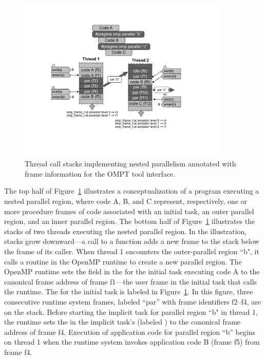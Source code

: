    \begin{figure}[h]
    \centering
        \includegraphics[width=4in]{appendices/callstack-cropped.pdf}
    \caption{Thread call stacks implementing nested parallelism
      annotated with frame information for the OMPT tool interface.}
    \label{fig:frame}
\end{figure}

The top half of Figure~\ref{fig:frame} illustrates a
conceptualization of a program executing a nested
parallel region, where code A, B, and C represent, respectively, one
or more procedure frames of code
associated with an initial task, an outer parallel region, and an inner parallel
region. The bottom half of Figure~\ref{fig:frame} illustrates the stacks of two
threads executing the nested parallel region.
In the illustration, stacks grow downward---a call to a function adds
a new frame to the stack below the frame of its caller.
When thread 1 encounters the outer-parallel
region ``b", it calls a routine in the OpenMP runtime to
create a new parallel region. The OpenMP runtime sets the
 field in the  for the initial
task executing code A to the canonical frame address of frame f1---the user frame in the initial task
that calls the runtime. The  for the initial task
is labeled  in Figure~\ref{fig:frame}. In this figure, three
consecutive runtime system frames, labeled ``par'' with frame
identifiers f2--f4, are on the stack.  Before starting the implicit
task for parallel region ``b" in thread 1, the runtime sets the
 in the implicit task's  (labeled
) to the canonical frame address of frame f4. Execution of application code for parallel region
``b'' begins on thread 1 when the runtime system invokes application
code B (frame f5) from frame f4.

